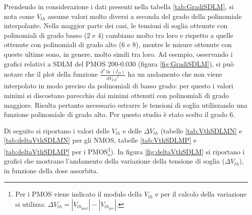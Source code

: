 Prendendo in considerazione i dati presenti nella tabella \ref{tab:GradiSDLM}, si nota come $V_{th}$ assume valori molto diversi a seconda del grado della polinomiale interpolante. Nella maggior parte dei casi, le tensioni di soglia ottenute con polinomiali di grado basso (2 e 4) cambiano molto tra loro e rispetto a quelle ottenute con polinomiali di grado alto (6 e 8), mentre le misure ottenute con queste ultime sono, in genere, molto simili tra loro. Ad esempio, osservando i grafici relativi a SDLM del PMOS 200-0.030 (figura \ref{fig:GradiSDLM}), si può notare che il plot della funzione $\frac{d^2 \ln (I_D)}{d{V_{GS}}^2}$ ha un andamento che non viene interpolato in modo preciso da polinomiali di basso grado: per questo i valori minimi si discostano parecchio dai minimi ottenuti con polinomiali di grado maggiore. Risulta pertanto necessario estrarre le tensioni di soglia utilizzando una funzione polinomiale di grado alto. Per questo studio è stato scelto il grado 6.

Di seguito si riportano i valori delle $V_{th}$ e delle $\Delta V_{th}$ (tabelle \ref{tab:VthSDLMN} e \ref{tab:deltaVthSDLMN} per gli NMOS, tabelle \ref{tab:VthSDLMP} e \ref{tab:deltaVthSDLMP} per i PMOS\footnote{Per i PMOS viene indicato il modulo della $V_{th}$ e per il calcolo della variazione si utilizza: $\Delta V_{th} = |V_{th_{post}}| - |V_{th_{pre}}|$.}). In figura \ref{fig:deltaVthSDLM} si riportano i grafici che mostrano l'andamento della variazione della tensione di soglia ($\Delta V_{th}$), in funzione della dose assorbita.

\clearpage

